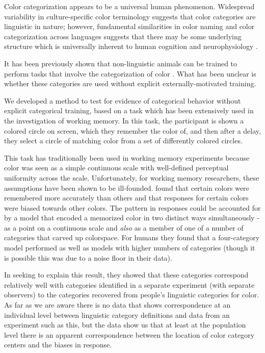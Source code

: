Color categorization appears to be a universal human phenomenon. 
Widespread variability in culture-specific color terminology suggests that color categories are linguistic in nature; however, fundamental similarities in color naming and color categorization across languages suggests that there may be some underlying structure which is universally inherent to human cognition and neurophysiology \citep{berlin_basic_1991,gibson_color_2017}. 

It has been previously shown that non-linguistic animals can be trained to perform tasks that involve the categorization of color \citep{sandell_color_1979,fagot_cross-species_2006}. 
What has been unclear is whether these categories are used without explicit externally-motivated training.


We developed a method to test for evidence of categorical behavior without explicit categorical training, based on a task which has been extensively used in the investigation of working memory. %
In this task, the participant is shown a colored circle on screen, which they remember the color of, and then after a delay, they select a circle of matching color from a set of differently colored circles.

This task has traditionally been used in working memory experiments because color was seen as a simple continuous scale with well-defined perceptual uniformity across the scale. 
Unfortunately, for working memory researchers, these assumptions have been shown to be ill-founded.
\cite{bae_why_2015} found that certain colors were remembered more accurately than others and that responses for certain colors were biased towards other colors.
The pattern in responses could be accounted for by a model that encoded a memorized color in two distinct ways simultaneously - as a point on a continuous scale and \emph{also} as a member of one of a number of categories that carved up colorspace. 
For humans they found that a four-category model performed as well as models with higher numbers of categories (though it is possible this was due to a noise floor in their data).

In seeking to explain this result, they showed that these categories correspond relatively well with categories identified in a separate experiment (with separate observers) to the categories recovered from people's linguistic categories for color. 
As far as we are aware there is no data that shows correspondence at an individual level between linguistic category definitions and data from an experiment such as this, but the \cite{bae_why_2015} data show us that at least at the population level there is an apparent correspondence between the location of color category centers and the biases in response.

